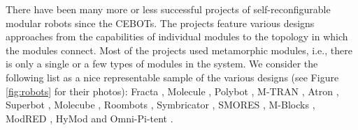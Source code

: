 There have been many more or less successful projects of self-reconfigurable
modular robots since the CEBOTs. The projects feature various designs approaches
from the capabilities of individual modules to the topology in which the modules
connect. Most of the projects used metamorphic modules, i.e., there is only a
single or a few types of modules in the system. We consider the following list
as a nice representable sample of the various designs (see Figure
\ref{fig:robots} for their photos): Fracta \cite{DBLP:conf/icra/MurataKK94},
Molecule \cite{DBLP:conf/icra/KotayRVM98}, Polybot
\cite{DBLP:conf/icra/YimDR00}, M-TRAN \cite{DBLP:conf/icarcv/KurokawaKYTMK02},
Atron \cite{DBLP:conf/iros/JorgensenOL04}, Superbot
\cite{DBLP:conf/iros/SalemiMS06}, Molecube \cite{DBLP:journals/trob/ZykovMDL07},
Roombots \cite{DBLP:conf/icra/SprowitzBDI09}, Symbricator
\cite{DBLP:journals/corr/abs-1109-2288}, SMORES \cite{DBLP:conf/iros/DaveyKY12},
M-Blocks \cite{DBLP:conf/iros/RomanishinGR13}, ModRED
\cite{DBLP:journals/ras/BacaHDND14}, HyMod \cite{DBLP:conf/dars/ParrottDG16} and
Omni-Pi-tent \cite{DBLP:conf/taros/PeckTT19}.

